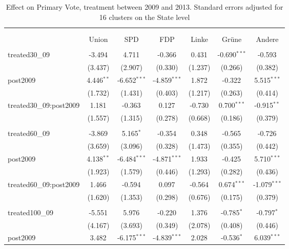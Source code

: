 \documentclass[12pt]{article}
\begin{document}
 
\begin{table}[!htbp] \centering
  \caption{Effect on Primary Vote, treatment between 2009 and 2013. Standard errors adjusted for 16 clusters on the State level}
\begin{tabular}{@{\extracolsep{5pt}}lcccccc}
\\[-1.8ex]\hline
\hline \\[-1.8ex]
\\[-1.8ex] & \multicolumn{1}{c}{Union} & \multicolumn{1}{c}{SPD} & \multicolumn{1}{c}{FDP} & \multicolumn{1}{c}{Linke} & \multicolumn{1}{c}{Grüne} & \multicolumn{1}{c}{Andere}  \\
\hline \\[-1.8ex]
 treated30_09 & -3.494$^{}$ & 4.711$^{}$ & -0.366$^{}$ & 0.431$^{}$ & -0.690$^{***}$ & -0.593$^{}$ \\
  & (3.437) & (2.907) & (0.330) & (1.237) & (0.266) & (0.382) \\
 post2009 & 4.446$^{**}$ & -6.652$^{***}$ & -4.859$^{***}$ & 1.872$^{}$ & -0.322$^{}$ & 5.515$^{***}$ \\
  & (1.732) & (1.431) & (0.403) & (1.217) & (0.263) & (0.414) \\
 treated30_09:post2009 & 1.181$^{}$ & -0.363$^{}$ & 0.127$^{}$ & -0.730$^{}$ & 0.700$^{***}$ & -0.915$^{**}$ \\
  & (1.557) & (1.315) & (0.278) & (0.668) & (0.186) & (0.379) \\
\hline \\[-1.8ex]
 treated60_09 & -3.869$^{}$ & 5.165$^{*}$ & -0.354$^{}$ & 0.348$^{}$ & -0.565$^{}$ & -0.726$^{}$ \\
  & (3.659) & (3.096) & (0.328) & (1.473) & (0.355) & (0.442) \\
 post2009 & 4.138$^{**}$ & -6.484$^{***}$ & -4.871$^{***}$ & 1.933$^{}$ & -0.425$^{}$ & 5.710$^{***}$ \\
  & (1.923) & (1.579) & (0.446) & (1.293) & (0.282) & (0.436) \\
 treated60_09:post2009 & 1.466$^{}$ & -0.594$^{}$ & 0.097$^{}$ & -0.564$^{}$ & 0.674$^{***}$ & -1.079$^{***}$ \\
  & (1.620) & (1.353) & (0.298) & (0.676) & (0.175) & (0.379) \\
\hline \\[-1.8ex]
 treated100_09 & -5.551$^{}$ & 5.976$^{}$ & -0.220$^{}$ & 1.376$^{}$ & -0.785$^{*}$ & -0.797$^{*}$ \\
  & (4.167) & (3.693) & (0.349) & (2.078) & (0.408) & (0.446) \\
 post2009 & 3.482$^{}$ & -6.175$^{***}$ & -4.839$^{***}$ & 2.028$^{}$ & -0.536$^{*}$ & 6.039$^{***}$ \\

\end{tabular}
\end{table}
\end{document}
